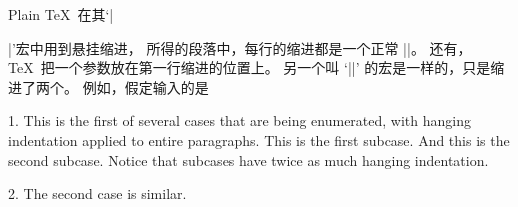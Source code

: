 \danger Plain \TeX\ 在其`|\item|'宏中用到悬挂缩进，
所得的段落中，每行的缩进都是一个正常 |\indent|。%
还有， \TeX\ 把一个参数放在第一行缩进的位置上。%
另一个叫 `|\itemitem|' 的宏是一样的，只是缩进了两个。%
例如，假定输入的是
\begintt
\item{1.} This is the first of several cases that are being
enumerated, with hanging indentation applied to entire paragraphs.
 This is the first subcase.
 And this is the second subcase. Notice
that subcases have twice as much hanging indentation.
\item{2.} The second case is similar.
